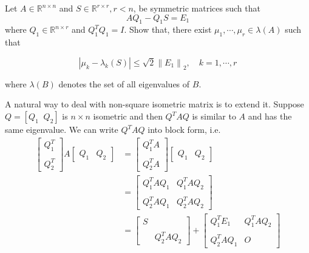 \begin{problem}{}
    Let $A \in \mathbb{R}^{n \times n}$ and $S \in \mathbb{R}^{r \times r}, r<n$, be symmetric matrices such that
    \begin{equation}
    \label{eq_ex01}
        A Q_1-Q_1 S=E_1
    \end{equation}
    where $Q_1 \in \mathbb{R}^{n \times r}$ and $Q_1^T Q_1=I$. Show that, there exist $\mu_1, \cdots, \mu_r \in \lambda(A)$ such that
    
    $$
    \left|\mu_k-\lambda_k(S)\right| \leq \sqrt{2}\left\|E_1\right\|_2, \quad k=1, \cdots, r
    $$
    
    where $\lambda(B)$ denotes the set of all eigenvalues of $B$.
\end{problem}

A natural way to deal with non-square isometric matrix is to extend it. Suppose $Q = [Q_{1} \;\;Q_{2}]$ is $n\times n$ isometric and then $Q^{T} AQ$ is similar to $A$ and has the same eigenvalue. We can write $Q^{T}A Q$ into block form, i.e.
$$
\begin{aligned}
\begin{bmatrix}
     Q_{1}^{T}  \\
     \\
     Q_{2}^{T} 
\end{bmatrix} A
\begin{bmatrix}
    Q_{1} & Q_{2}
\end{bmatrix} &= \begin{bmatrix}
     Q_{1}^{T} A \\
     \\
     Q_{2}^{T} A
\end{bmatrix}\begin{bmatrix}
    Q_{1} & Q_{2}
\end{bmatrix}\\
& = \begin{bmatrix}
    Q_{1}^{T}AQ_{1} & Q_{1}^{T}AQ_{2}\\
    \\
    Q_{2}^{T} A Q_{1} & Q_{2}^{T}AQ_{2}
\end{bmatrix}\\
& = \begin{bmatrix}
    S & \\
    \\
     & Q_{2}^{T}A Q_{2}
\end{bmatrix} + \begin{bmatrix}
    Q_{1}^{T} E_{1} & Q_{1}^{T}AQ_{2}\\
    \\
    Q_{2}^{T} A Q_{1} & O
\end{bmatrix}
\end{aligned}
$$

